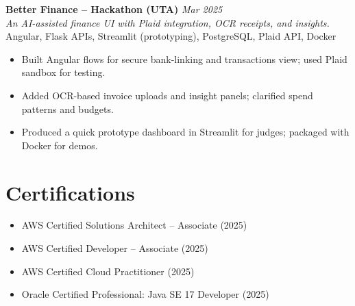 \documentclass[10pt, letterpaper]{article}
\newenvironment{highlights}{\begin{itemize}[topsep=0.08 cm, parsep=0.06 cm, partopsep=0pt, itemsep=2pt, leftmargin=10pt]}{\end{itemize}}
\begin{document}
\textbf{Better Finance – Hackathon (UTA)} \hfill \textit{Mar 2025} \\
\textit{An AI-assisted finance UI with Plaid integration, OCR receipts, and insights.} \\
Angular, Flask APIs, Streamlit (prototyping), PostgreSQL, Plaid API, Docker \\
\begin{highlights}
    \item Built Angular flows for secure bank-linking and transactions view; used Plaid sandbox for testing.
    \item Added OCR-based invoice uploads and insight panels; clarified spend patterns and budgets.
    \item Produced a quick prototype dashboard in Streamlit for judges; packaged with Docker for demos.
\end{highlights}

\section{Certifications}
\begin{highlights}
    \item AWS Certified Solutions Architect – Associate (2025)
    \item AWS Certified Developer – Associate (2025)
    \item AWS Certified Cloud Practitioner (2025)
    \item Oracle Certified Professional: Java SE 17 Developer (2025)
\end{highlights}
\end{document}
